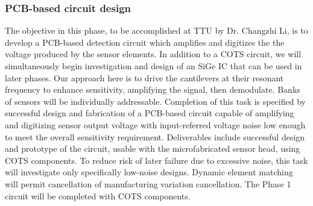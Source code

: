 \subsubsection{PCB-based circuit design}\label{sec:p1:cir}

The objective in this phase, to be accomplished at TTU by Dr. Changzhi Li, is to develop a PCB-based detection circuit which amplifies and digitizes the the voltage produced by the sensor elements. In addition to a COTS circuit, we will simultaneously begin investigation and design of an SiGe IC that can be used in later phases. Our approach here is to drive the cantilevers at their resonant frequency to enhance sensitivity, amplifying the signal, then demodulate. Banks of sensors will be individually addressable. Completion of this task is specified by successful design and fabrication of a PCB-based circuit capable of amplifying and digitizing sensor output voltage with input-referred voltage noise low enough to meet the overall sensitivity requirement. Deliverables include successful design and prototype of the circuit, usable with the microfabricated sensor head, using COTS components. To reduce risk of later failure due to excessive noise, this task will investigate only specifically low-noise designs. Dynamic element matching will permit cancellation of manufacturing variation cancellation. The Phase 1 circuit will be completed with COTS components.

